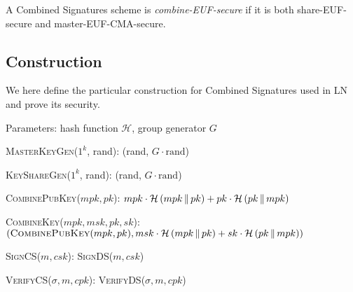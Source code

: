   \begin{definition}
    A Combined Signatures scheme is \emph{\textsf{combine-EUF}-secure} if it
    is both \textsf{share-EUF}-secure and \textsf{master-EUF-CMA}-secure.
  \end{definition}

  \subsection{Construction}
    We here define the particular construction for Combined Signatures used in
    LN and prove its security.

    Parameters: hash function $\mathcal{H}$, group generator $G$
    \begin{algorithmic}[0]
      \State \textsc{MasterKeyGen}($1^k$, rand):
      \Indent
        \State \Return (rand, $G \cdot \mathrm{rand}$)
      \EndIndent
    \end{algorithmic}

    \begin{algorithmic}[0]
      \State \textsc{KeyShareGen}($1^k$, rand):
      \Indent
        \State \Return (rand, $G \cdot \mathrm{rand}$)
      \EndIndent
    \end{algorithmic}

    \begin{algorithmic}[0]
      \State \textsc{CombinePubKey}($mpk, pk$):
      \Indent
        \State \Return $mpk \cdot \mathcal{H}\left(mpk \,\|\, pk\right) + pk
        \cdot \mathcal{H}\left(pk \,\|\, mpk\right)$
      \EndIndent
    \end{algorithmic}

    \begin{algorithmic}[0]
      \State \textsc{CombineKey}($mpk, msk, pk, sk$):
      \Indent
        \State \Return $(\textsc{CombinePubKey}(mpk, pk), msk \cdot
        \mathcal{H}\left(mpk \,\|\, pk\right) + sk \cdot \mathcal{H}\left(pk
        \,\|\, mpk\right))$
      \EndIndent
    \end{algorithmic}

    \begin{algorithmic}[0]
      \State \textsc{SignCS}($m, csk$):
      \Indent
        \State \Return \textsc{SignDS}($m, csk$)
      \EndIndent
    \end{algorithmic}

    \begin{algorithmic}[0]
      \State \textsc{VerifyCS}($\sigma, m, cpk$):
      \Indent
        \State \Return \textsc{VerifyDS}($\sigma, m, cpk$)
      \EndIndent
    \end{algorithmic}

